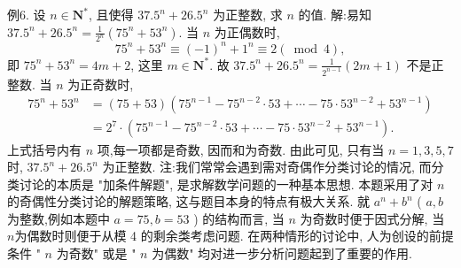 例6. 设 $n \in \mathbf{N}^*$, 且使得 $37.5^n+26.5^n$ 为正整数, 求 $n$ 的值.
解:易知 $37.5^n+26.5^n=\frac{1}{2^n}\left(75^n+53^n\right)$.
当 $n$ 为正偶数时,
$$
75^n+53^n \equiv(-1)^n+1^n \equiv 2(\bmod 4),
$$
即 $75^n+53^n=4 m+2$, 这里 $m \in \mathbf{N}^*$. 故 $37.5^n+26.5^n=\frac{1}{2^{n-1}}(2 m+1)$ 不是正整数.
当 $n$ 为正奇数时,
$$
\begin{aligned}
75^n+53^n & =(75+53)\left(75^{n-1}-75^{n-2} \cdot 53+\cdots-75 \cdot 53^{n-2}+53^{n-1}\right) \\
& =2^7 \cdot\left(75^{n-1}-75^{n-2} \cdot 53+\cdots-75 \cdot 53^{n-2}+53^{n-1}\right) .
\end{aligned}
$$
上式括号内有 $n$ 项,每一项都是奇数, 因而和为奇数.
由此可见, 只有当 $n=1,3,5,7$ 时, $37.5^n+26.5^n$ 为正整数.
注:我们常常会遇到需对奇偶作分类讨论的情况, 而分类讨论的本质是 "加条件解题", 是求解数学问题的一种基本思想.
本题采用了对 $n$ 的奇偶性分类讨论的解题策略, 这与题目本身的特点有极大关系.
就 $a^n+b^n$ ( $a, b$ 为整数,例如本题中 $a=75, b=53$ ) 的结构而言, 当 $n$ 为奇数时便于因式分解, 当 $n$为偶数时则便于从模 4 的剩余类考虑问题.
在两种情形的讨论中, 人为创设的前提条件 " $n$ 为奇数" 或是 " $n$ 为偶数" 均对进一步分析问题起到了重要的作用.



